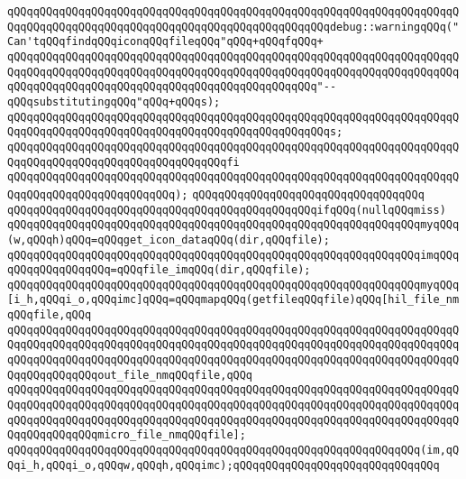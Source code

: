 \verb|qQQqqQQqqQQqqQQqqQQqqQQqqQQqqQQqqQQqqQQqqQQqqQQqqQQqqQQqqQQqqQQqqQQqqQQqqQQqqQQqqQQqqQQqqQQqqQQqqQQqqQQqqQQqqQQqqQQqqQQqdebug::warningqQQq("Can'tqQQqfindqQQqiconqQQqfileqQQq"qQQq+qQQqfqQQq+|\newline
\verb|qQQqqQQqqQQqqQQqqQQqqQQqqQQqqQQqqQQqqQQqqQQqqQQqqQQqqQQqqQQqqQQqqQQqqQQqqQQqqQQqqQQqqQQqqQQqqQQqqQQqqQQqqQQqqQQqqQQqqQQqqQQqqQQqqQQqqQQqqQQqqQQqqQQqqQQqqQQqqQQqqQQqqQQqqQQqqQQqqQQqqQQqqQQq"--qQQqsubstitutingqQQq"qQQq+qQQqs);|\newline
\verb|qQQqqQQqqQQqqQQqqQQqqQQqqQQqqQQqqQQqqQQqqQQqqQQqqQQqqQQqqQQqqQQqqQQqqQQqqQQqqQQqqQQqqQQqqQQqqQQqqQQqqQQqqQQqqQQqqQQqqQQqs;|\newline
\verb|qQQqqQQqqQQqqQQqqQQqqQQqqQQqqQQqqQQqqQQqqQQqqQQqqQQqqQQqqQQqqQQqqQQqqQQqqQQqqQQqqQQqqQQqqQQqqQQqqQQqqQQqfi|\newline
\verb|qQQqqQQqqQQqqQQqqQQqqQQqqQQqqQQqqQQqqQQqqQQqqQQqqQQqqQQqqQQqqQQqqQQqqQQqqQQqqQQqqQQqqQQqqQQqqQQq);|\newline
\verb|qQQqqQQqqQQqqQQqqQQqqQQqqQQqqQQqqQQq|\newline
\verb|qQQqqQQqqQQqqQQqqQQqqQQqqQQqqQQqqQQqqQQqqQQqqQQqifqQQq(nullqQQqmiss)|\newline
\newline
\verb|qQQqqQQqqQQqqQQqqQQqqQQqqQQqqQQqqQQqqQQqqQQqqQQqqQQqqQQqqQQqqQQqmyqQQq(w,qQQqh)qQQq=qQQqget_icon_dataqQQq(dir,qQQqfile);|\newline
\verb|qQQqqQQqqQQqqQQqqQQqqQQqqQQqqQQqqQQqqQQqqQQqqQQqqQQqqQQqqQQqqQQqimqQQqqQQqqQQqqQQqqQQq=qQQqfile_imqQQq(dir,qQQqfile);|\newline
\verb|qQQqqQQqqQQqqQQqqQQqqQQqqQQqqQQqqQQqqQQqqQQqqQQqqQQqqQQqqQQqqQQqmyqQQq[i_h,qQQqi_o,qQQqimc]qQQq=qQQqmapqQQq(getfileqQQqfile)qQQq[hil_file_nmqQQqfile,qQQq|\newline
\verb|qQQqqQQqqQQqqQQqqQQqqQQqqQQqqQQqqQQqqQQqqQQqqQQqqQQqqQQqqQQqqQQqqQQqqQQqqQQqqQQqqQQqqQQqqQQqqQQqqQQqqQQqqQQqqQQqqQQqqQQqqQQqqQQqqQQqqQQqqQQqqQQqqQQqqQQqqQQqqQQqqQQqqQQqqQQqqQQqqQQqqQQqqQQqqQQqqQQqqQQqqQQqqQQqqQQqqQQqqQQqqQQqout_file_nmqQQqfile,qQQq|\newline
\verb|qQQqqQQqqQQqqQQqqQQqqQQqqQQqqQQqqQQqqQQqqQQqqQQqqQQqqQQqqQQqqQQqqQQqqQQqqQQqqQQqqQQqqQQqqQQqqQQqqQQqqQQqqQQqqQQqqQQqqQQqqQQqqQQqqQQqqQQqqQQqqQQqqQQqqQQqqQQqqQQqqQQqqQQqqQQqqQQqqQQqqQQqqQQqqQQqqQQqqQQqqQQqqQQqqQQqqQQqqQQqqQQqmicro_file_nmqQQqfile];|\newline
\newline
\verb|qQQqqQQqqQQqqQQqqQQqqQQqqQQqqQQqqQQqqQQqqQQqqQQqqQQqqQQqqQQqqQQq(im,qQQqi_h,qQQqi_o,qQQqw,qQQqh,qQQqimc);qQQqqQQqqQQqqQQqqQQqqQQqqQQqqQQq|\newline
